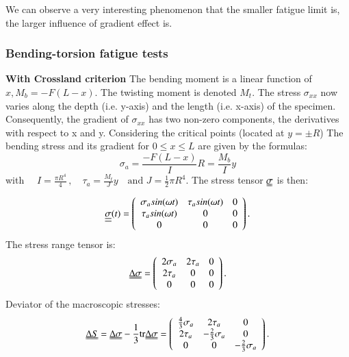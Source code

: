 \documentclass[3p,times,procedia,number]{elsarticle}
\begin{document}
We can observe a very interesting phenomenon that the smaller fatigue limit is, the larger influence of gradient effect is.

\newpage
\subsubsection{Bending-torsion fatigue tests}
\textbf{With Crossland criterion}
The bending moment is a linear function of $x, M_b= -F(L-x)$. The twisting moment is denoted $M_t$. The stress $\sigma_{xx}$ now varies along the depth (i.e. y-axis) and the length (i.e. x-axis) of the specimen. Consequently, the gradient of $\sigma_{xx}$ has two non-zero components, the derivatives with respect to x and y. Considering the critical points (located at
$y=\pm R$) The bending stress and its gradient for $0\leqslant x\leqslant L$ are given by the formulas: 
\begin{equation}
\sigma_{a}=\frac{-F(L-x)}{I}R=\frac{M_b}{I}y
\end{equation}
with $\quad I=\frac{\pi R^4}{4}\,,\quad 
\tau_{a}=\frac{M_t}{J}y \quad \text{and  }
J=\frac{1}{2}\pi R^4$.
The stress tensor $\uuline{\sigma}$ is then:
\begin{equation} 
\uline{\uline{\sigma}}(t)=
\left(
\begin{array}{ccc}
\sigma_{a}sin(\omega t) & \tau_asin(\omega t) & 0\\
\tau_asin(\omega t) & 0 & 0\\ 
0 & 0 & 0\\
\end{array}\right) .
\end{equation}
The stress range tensor is:
\begin{equation} 
\uuline{\Delta\sigma}=
\left(
\begin{array}{ccc}
2\sigma_a& 2\tau_a & 0\\
2\tau_a& 0 & 0\\ 
0 & 0 & 0\\
\end{array}\right) .
\end{equation}
Deviator of the macroscopic stresses:
\begin{equation} 
\uuline{\Delta S}=\uuline{\Delta\sigma}-\frac{1}{3}\textrm{tr}\uuline{\Delta\sigma}=
\left(
\begin{array}{ccc}
\frac{4}{3}\sigma_{a} & 2\tau_a & 0\\
2\tau_a & -\frac{2}{3}\sigma_a & 0\\ 
0 & 0 & -\frac{2}{3}\sigma_a\\
\end{array}\right) .
\end{equation}
\end{document}
